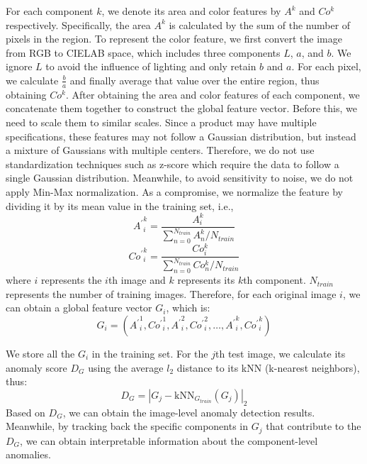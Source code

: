\documentclass[final,5p,times,twocolumn]{elsarticle}
\begin{document}
For each component $k$, we denote its area and color features by $A^{k}$ and $Co^{k}$ respectively. Specifically, the area $A^{k}$ is calculated by the sum of the number of pixels in the region. To represent the color feature, we first convert the image from RGB to CIELAB space, which includes three components $L$, $a$, and $b$. We ignore $L$ to avoid the influence of lighting and only retain $b$ and $a$. For each pixel, we calculate $\frac{b}{a}$ and finally average that value over the entire region, thus obtaining $Co^{k}$. After obtaining the area and color features of each component, we concatenate them together to construct the global feature vector. Before this, we need to scale them to similar scales. Since a product may have multiple specifications, these features may not follow a Gaussian distribution, but instead a mixture of Gaussians with multiple centers. Therefore, we do not use standardization techniques such as z-score which require the data to follow a single Gaussian distribution. Meanwhile, to avoid sensitivity to noise, we do not apply Min-Max normalization. As a compromise, we normalize the feature by dividing it by its mean value in the training set, i.e., 
\begin{equation}
    {A^{'}}^{k}_{i}=\frac{A^{k}_i}{\sum_{n=0}^{N_{train}}A^{k}_n/N_{train}}
\end{equation}
\begin{equation}
    {Co^{'}}^{k}_{i}=\frac{Co^{k}_i}{\sum_{n=0}^{N_{train}}Co^{k}_n/N_{train}}
\end{equation}
where $i$ represents the $i$th image and $k$ represents its $k$th component. $N_{train}$ represents the number of training images. Therefore, for each original image $i$, we can obtain a global feature vector $G_i$, which is:
\begin{equation}
G_i=({{A^{'}}^1_i},{{Co^{'}}^1_i},{{A^{'}}^2_i},{{Co^{'}}^2_i},\dots, {{A^{'}}^k_i},{{Co^{'}}^k_i})
\end{equation}

We store all the $G_i$ in the training set. For the $j$th test image, we calculate its anomaly score $D_G$ using the average $l_2$ distance to its kNN (k-nearest neighbors), thus:
\begin{equation}
D_G= |G_{j} - \mathrm{kNN}_{G_{train}}(G_{j})|_2
\end{equation}
Based on $D_G$, we can obtain the image-level anomaly detection results. Meanwhile, by tracking back the specific components in $G_{j}$ that contribute to the $D_G$, we can obtain interpretable information about the component-level anomalies. 
\end{document}
